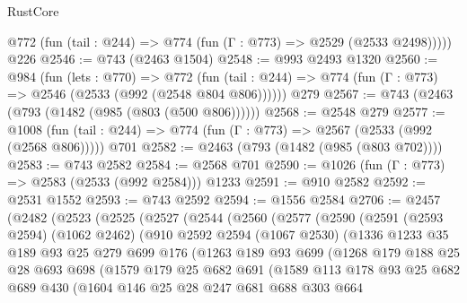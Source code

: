 \begin{lexlean}{RustCore}
\begin{coremodule}
      @772 (fun (tail : @244) => @774 (fun (Γ : @773) => @2529 (@2533 @2498)))))
    @226
@2546 := @743 (@2463 @1504)
@2548 := @993 @2493 @1320
@2560 := @984
    (fun (lets : @770) =>
    @772 (fun (tail : @244) => @774 (fun (Γ : @773) => @2546 (@2533 (@992 (@2548 @804 @806))))))
    @279
@2567 := @743 (@2463 (@793 (@1482 (@985 (@803 (@500 @806))))))
@2568 := @2548 @279
@2577 := @1008
    (fun (tail : @244) => @774 (fun (Γ : @773) => @2567 (@2533 (@992 (@2568 @806)))))
    @701
@2582 := @2463 (@793 (@1482 (@985 (@803 @702))))
@2583 := @743 @2582
@2584 := @2568 @701
@2590 := @1026 (fun (Γ : @773) => @2583 (@2533 (@992 @2584))) @1233
@2591 := @910 @2582
@2592 := @2531 @1552
@2593 := @743 @2592
@2594 := @1556 @2584
@2706 := @2457
    (@2482
      (@2523
        (@2525
          (@2527
            (@2544
              (@2560
                (@2577
                  (@2590
                    (@2591
                      (@2593 @2594)
                      (@1062 @2462)
                      (@910
                        @2592
                        @2594
                        (@1067 @2530)
                        (@1336
                          @1233
                          @35
                          @189
                          @93
                          @25
                          @279
                          @699
                          @176
                          (@1263
                            @189
                            @93
                            @699
                            (@1268
                              @179
                              @188
                              @25
                              @28
                              @693
                              @698
                              (@1579
                                @179
                                @25
                                @682
                                @691
                                (@1589
                                  @113
                                  @178
                                  @93
                                  @25
                                  @682
                                  @689
                                  @430
                                  (@1604
                                    @146
                                    @25
                                    @28
                                    @247
                                    @681
                                    @688
                                    @303
                                    @664

\end{coremodule}
\end{lexlean}
